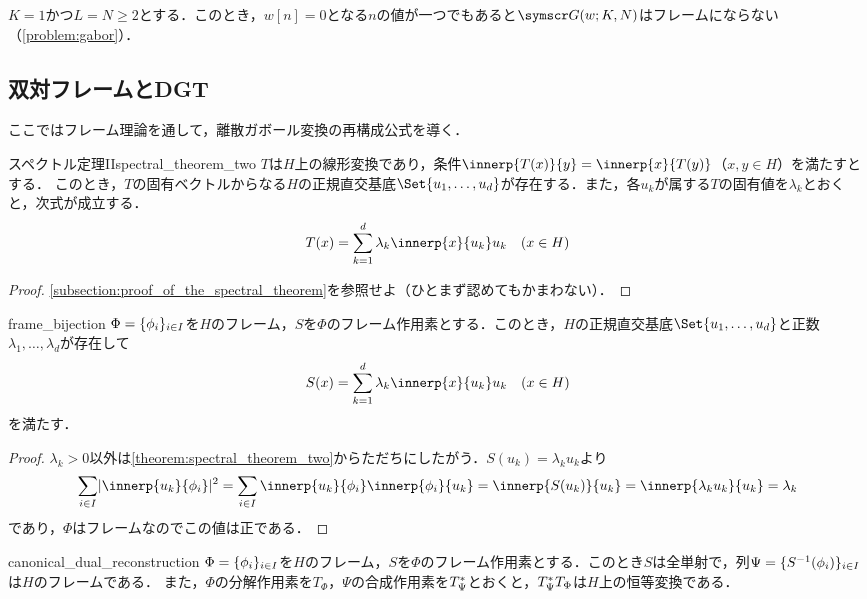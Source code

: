 \documentclass[../../main]{subfiles}
\begin{document}
\begin{example}
  \(K=1\)かつ\(L=N\geq 2\)とする．このとき，\(w[n]=0\)となる\(n\)の値が一つでもあると\(\gaborsys{w}{K}{N}\)はフレームにならない（\cref{problem:gabor}）．
\end{example}

\subsection{双対フレームとDGT}

ここではフレーム理論を通して，離散ガボール変換の再構成公式を導く．

\begin{theorem}{スペクトル定理II}{spectral_theorem_two}
  \(T\)は\(H\)上の線形変換であり，条件\(\innerp{T(x)}{y}=\innerp{x}{T(y)}\)（\(x,y\in H\)）を満たすとする．
  このとき，\(T\)の固有ベクトルからなる\(H\)の正規直交基底\(\Set{u_1,\dots,u_d}\)が存在する．また，各\(u_k\)が属する\(T\)の固有値を\(\lambda_k\)とおくと，次式が成立する．
  \[
    T(x) = \sum_{k=1}^d\lambda_k\innerp{x}{u_k}u_k\quad(x\in H)
  \]
\end{theorem}

\begin{proof}
  \cref{subsection:proof_of_the_spectral_theorem}を参照せよ（ひとまず認めてもかまわない）．
\end{proof}

\begin{corollary}{}{frame_bijection}
  \(\Phi=\lbrace\phi_i\rbrace_{i\in I}\)を\(H\)のフレーム，\(S\)を\(\Phi\)のフレーム作用素とする．このとき，\(H\)の正規直交基底\(\Set{u_1,\dots,u_d}\)と正数\(\lambda_1,\dots,\lambda_d\)が存在して
  \[
    S(x) = \sum_{k=1}^d\lambda_k\innerp{x}{u_k}u_k\quad(x\in H)
  \]
  を満たす．
\end{corollary}

\begin{proof}
  \(\lambda_k>0\)以外は\cref{theorem:spectral_theorem_two}からただちにしたがう．\(S(u_k)=\lambda_ku_k\)より
  \[
    \sum_{i\in I}\abs{\innerp{u_k}{\phi_i}}^2 = \sum_{i\in I}\innerp{u_k}{\phi_i}\innerp{\phi_i}{u_k}
    = \innerp{S(u_k)}{u_k}
    = \innerp{\lambda_ku_k}{u_k}
    = \lambda_k
  \]
  であり，\(\Phi\)はフレームなのでこの値は正である．
\end{proof}

\begin{proposition}{}{canonical_dual_reconstruction}
  \(\Phi=\lbrace\phi_i\rbrace_{i\in I}\)を\(H\)のフレーム，\(S\)を\(\Phi\)のフレーム作用素とする．このとき\(S\)は全単射で，列\(\Psi=\lbrace S^{-1}(\phi_i)\rbrace_{i\in I}\)は\(H\)のフレームである．
  また，\(\Phi\)の分解作用素を\(T_\Phi\)，\(\Psi\)の合成作用素を\(T_\Psi^{\mathord{\ast}}\)とおくと，\(T_\Psi^{\mathord{\ast}}T_\Phi\)は\(H\)上の恒等変換である．
\end{proposition}
\end{document}
